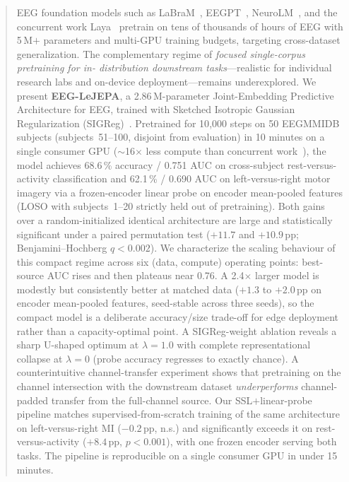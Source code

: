 \begin{abstract}
EEG foundation models such as LaBraM~\cite{labram2024}, EEGPT~\cite{eegpt2024},
NeuroLM~\cite{neurolm2025}, and the concurrent work Laya~\cite{laya2026} pretrain
on tens of thousands of hours of EEG with 5\,M$+$ parameters and
multi-GPU training budgets, targeting cross-dataset generalization. The
complementary regime of \emph{focused single-corpus pretraining for in-
distribution downstream tasks}---realistic for individual research labs and
on-device deployment---remains underexplored. We present
\textbf{EEG-LeJEPA}, a 2.86\,M-parameter Joint-Embedding Predictive
Architecture for EEG, trained with Sketched Isotropic Gaussian
Regularization (SIGReg)~\cite{lejepa2025}. Pretrained for 10{,}000 steps on
50 EEGMMIDB subjects (subjects~51--100, disjoint from evaluation) in 10
minutes on a single consumer GPU ($\sim$16$\times$ less compute than
concurrent work~\cite{laya2026}), the model achieves 68.6\,\% accuracy /
0.751 AUC on cross-subject rest-versus-activity classification and 62.1\,\% /
0.690 AUC on left-versus-right motor imagery via a frozen-encoder linear
probe on encoder mean-pooled features (LOSO with subjects~1--20 strictly
held out of pretraining). Both gains over a random-initialized identical
architecture are large and statistically significant under a paired
permutation test ($+11.7$ and $+10.9$\,pp; Benjamini--Hochberg
$q<0.002$). We characterize the scaling behaviour of this compact regime
across six (data, compute) operating points: best-source AUC rises and then
plateaus near 0.76. A 2.4$\times$ larger model is modestly but consistently
better at matched data ($+1.3$ to $+2.0$\,pp on encoder mean-pooled features,
seed-stable across three seeds), so the compact model is a deliberate
accuracy/size trade-off for edge deployment rather than a capacity-optimal
point. A SIGReg-weight ablation reveals a sharp
U-shaped optimum at $\lambda=1.0$ with complete representational collapse at
$\lambda=0$ (probe accuracy regresses to exactly chance). A counterintuitive
channel-transfer experiment shows that pretraining on the channel
intersection with the downstream dataset \emph{underperforms} channel-padded
transfer from the full-channel source. Our SSL$+$linear-probe pipeline
matches supervised-from-scratch training of the same architecture on
left-versus-right MI ($-0.2$\,pp, n.s.) and significantly exceeds it on
rest-versus-activity ($+8.4$\,pp, $p<0.001$), with one frozen encoder serving
both tasks. The pipeline is reproducible on a single consumer GPU in under
15 minutes.
\end{abstract}
